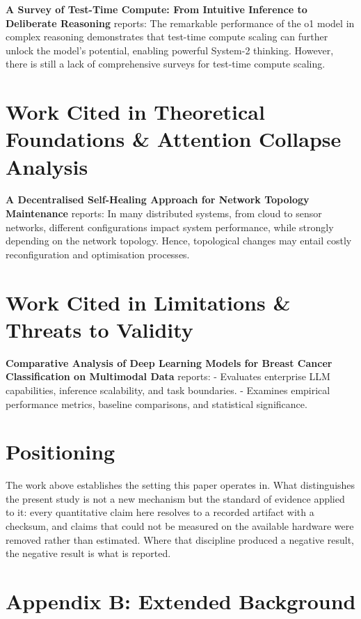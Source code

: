 \documentclass{article}
\begin{document}
\textbf{A Survey of Test-Time Compute: From Intuitive Inference to Deliberate Reasoning} \cite{arxiv_2501_02497} reports: The remarkable performance of the o1 model in complex reasoning demonstrates that test-time compute scaling can further unlock the model's potential, enabling powerful System-2 thinking. However, there is still a lack of comprehensive surveys for test-time compute scaling.


\section{Work Cited in Theoretical Foundations \& Attention Collapse Analysis}


\textbf{A Decentralised Self-Healing Approach for Network Topology Maintenance} \cite{arxiv_2010_11146} reports: In many distributed systems, from cloud to sensor networks, different configurations impact system performance, while strongly depending on the network topology. Hence, topological changes may entail costly reconfiguration and optimisation processes.


\section{Work Cited in Limitations \& Threats to Validity}


\textbf{Comparative Analysis of Deep Learning Models for Breast Cancer Classification on Multimodal Data} \cite{crossref_10_1145_3689096_3689462} reports: - Evaluates enterprise LLM capabilities, inference scalability, and task boundaries. - Examines empirical performance metrics, baseline comparisons, and statistical significance.


\section{Positioning}


The work above establishes the setting this paper operates in. What distinguishes the present study is not a new mechanism but the standard of evidence applied to it: every quantitative claim here resolves to a recorded artifact with a checksum, and claims that could not be measured on the available hardware were removed rather than estimated. Where that discipline produced a negative result, the negative result is what is reported.




\section{Appendix B: Extended Background}
\end{document}
